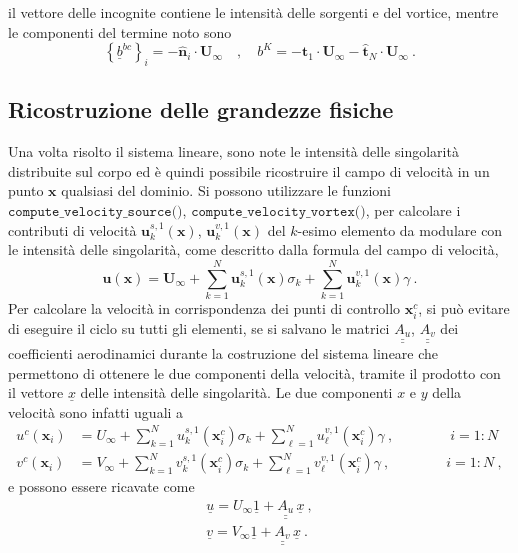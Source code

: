 il vettore delle incognite contiene le intensità delle sorgenti e del vortice, mentre le componenti del termine noto sono
\begin{equation}
 \left\{ \underline{b}^{bc} \right\}_i = - \bm{\hat{n}}_i \cdot \bm{U}_{\infty} \quad , \quad 
 b^{K} = - \bm{\hat{t}}_1 \cdot \bm{U}_{\infty} - \bm{\hat{t}}_N \cdot \bm{U}_{\infty} \ .
\end{equation}

\subsection{Ricostruzione delle grandezze fisiche}
Una volta risolto il sistema lineare, sono note le intensità delle singolarità distribuite sul corpo ed è quindi possibile ricostruire il campo di velocità in un punto $\bm{x}$ qualsiasi del dominio. Si possono utilizzare le funzioni $\texttt{compute\_velocity\_source()}$, $\texttt{compute\_velocity\_vortex()}$, per calcolare i contributi di velocità $\bm{u}^{s,1}_k(\bm{x})$, $\bm{u}^{v,1}_k(\bm{x})$ del $k$-esimo elemento da modulare con le intensità delle singolarità, come descritto dalla formula del campo di velocità,
\begin{equation}
  \bm{u}(\bm{x}) = \bm{U}_{\infty}
  + \displaystyle\sum_{k=1}^{N}\bm{u}^{s,1}_k(\bm{x}) \sigma_k 
  + \displaystyle\sum_{k=1}^{N}\bm{u}^{v,1}_k(\bm{x}) \gamma \ .
\end{equation}
Per calcolare la velocità in corrispondenza dei punti di controllo $\bm{x}^c_i$, si può evitare di eseguire il ciclo su tutti gli elementi, se si salvano le matrici ${\underline{\underline{A_u}}}$, ${\underline{\underline{A_v}}}$
 dei coefficienti aerodinamici durante la costruzione del sistema lineare che permettono di ottenere le due componenti della velocità, tramite il prodotto con il vettore $\underline{x}$ delle intensità delle singolarità.
Le due componenti $x$ e $y$ della velocità sono infatti uguali a
\begin{equation}
\begin{aligned}
 u^c(\bm{x}_i) & = U_{\infty} + \displaystyle\sum_{k=1}^{N} u^{s,1}_k(\bm{x}^c_i) \sigma_k 
  + \displaystyle\sum_{\ell=1}^{N} u^{v,1}_{\ell}(\bm{x}^c_i) \gamma \ , \qquad\qquad i=1:N \\
v^c(\bm{x}_i) & = V_{\infty} + \displaystyle\sum_{k=1}^{N} v^{s,1}_k(\bm{x}^c_i) \sigma_k 
  + \displaystyle\sum_{\ell=1}^{N} v^{v,1}_{\ell}(\bm{x}^c_i) \gamma \ , \qquad\qquad i=1:N \ ,
\end{aligned}
\end{equation}
e possono essere ricavate come
\begin{equation}
\begin{aligned}
 \underline{u} = U_{\infty} \underline{1} + \underline{\underline{A_u}} \, \underline{x} \ , \\
 \underline{v} = V_{\infty} \underline{1} + \underline{\underline{A_v}} \, \underline{x} \ . 
\end{aligned}
\end{equation}

